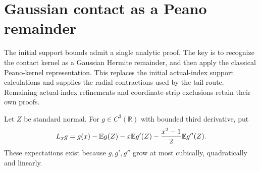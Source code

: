 \section{Gaussian contact as a Peano remainder}\label{gc:section}

The initial support bounds admit a single analytic proof. The key is to
recognize the contact kernel as a Gaussian Hermite remainder, and then
apply the classical Peano-kernel representation. This replaces the
initial actual-index support calculations and supplies the radial
contractions used by the tail route. Remaining actual-index refinements
and coordinate-strip exclusions retain their own proofs.

Let $Z$ be standard normal. For $g\in C^3(\mathbb R)$ with bounded
third derivative, put
\[
 L_xg=g(x)-\mathbb E g(Z)-x\mathbb E g'(Z)-\frac{x^2-1}{2}\mathbb E g''(Z).
\]
These expectations exist because $g,g',g''$ grow at most cubically,
quadratically and linearly.

